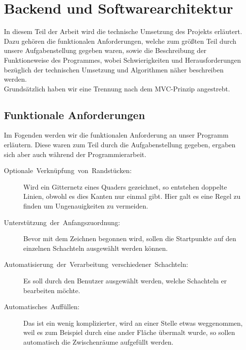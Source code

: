 \section{Backend und Softwarearchitektur}
\label{sec:backend}

In diesem Teil der Arbeit wird die technische Umsetzung des Projekts erläutert. Dazu gehören die funktionalen Anforderungen, welche zum größten Teil durch unsere Aufgabenstellung gegeben waren, sowie die Beschreibung der Funktioneweise des Programmes, wobei Schwierigkeiten und Herausforderungen bezüglich der technischen Umsetzung und Algorithmen näher beschreiben werden.\\

Grundsätzlich haben wir eine Trennung nach dem MVC-Prinzip angestrebt.

\subsection{Funktionale Anforderungen}
\label{subsec:anforderungen}

Im Fogenden werden wir die funktionalen Anforderung an unser Programm erläutern. Diese waren zum Teil durch die Aufgabenstellung gegeben, ergaben sich aber auch während der Programmierarbeit.

\begin{description}
  \item [{Optionale~Verknüpfung~von~Randstücken:}] Wird ein Gitternetz     eines Quaders gezeichnet, so entstehen doppelte Linien, obwohl es dies Kanten nur einmal gibt. Hier galt es eine Regel zu finden um Ungenauigkeiten zu vermeiden.
  \item [{Unterstützung~der~Anfangszuordnung:}] Bevor mit dem Zeichnen begonnen wird, sollen die Startpunkte auf den einzelnen Schachteln ausgewählt werden können.
  \item [{Automatisierung~der~Verarbeitung~verschiedener~Schachteln:}] Es soll durch den Benutzer ausgewählt werden, welche Schachteln er bearbeiten
  möchte.
  \item [{Automatisches~Auffüllen:}] Das ist ein wenig komplizierter, wird an einer Stelle etwas weggenommen, weil es zum Beispiel durch eine ander Fläche übermalt wurde, so sollen automatisch die Zwischenräume aufgefüllt werden.
\end{description}


